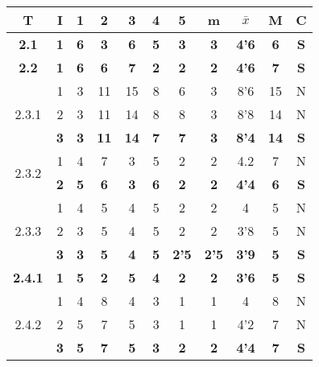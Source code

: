 \documentclass[11pt,a4paper,spanish,twoside]{report}
\begin{document}
\begin{table}[!h]
\centering
  \begin{tabular}{|c|c||c|c|c|c|c||c|c|c||c|}
    \hline
    \textbf{T} & \textbf{I} & \textbf{1} &
    \textbf{2} & \textbf{3} & \textbf{4} & \textbf{5} & \textbf{m}
    &\textbf{$\bar{x}$} &\textbf{M} & \textbf{C}\\
    \hline \hline
    \textbf{2.1} & \textbf{1} & \textbf{6} & \textbf{3} & \textbf{6} & \textbf{5} & \textbf{3} & \textbf{3} & \textbf{4'6} & \textbf{6} & \textbf{S}\\
    \hline

    \textbf{2.2} & \textbf{1} & \textbf{6} & \textbf{6} & \textbf{7} & \textbf{2} & \textbf{2} & \textbf{2} & \textbf{4'6} & \textbf{7} & \textbf{S}\\
    \hline

    \multirow{3}{*}{2.3.1}& 1 & 3 & 11 & 15 & 8 & 6 & 3 & 8'6 & 15 & N \\
    & 2 & 3 & 11 & 14 & 8 & 8 & 3 & 8'8 & 14 & N \\
    & \textbf{3} & \textbf{3} & \textbf{11} & \textbf{14} & \textbf{7} & \textbf{7} & \textbf{3} & \textbf{8'4} & \textbf{14} & \textbf{S} \\
    \hline

    \multirow{2}{*}{2.3.2} & 1 & 4 & 7 & 3 & 5 & 2 & 2 & 4.2 & 7 & N \\
    & \textbf{2} & \textbf{5} & \textbf{6} & \textbf{3} & \textbf{6} & \textbf{2} & \textbf{2} & \textbf{4'4} & \textbf{6} & \textbf{S} \\
    \hline

    \multirow{3}{*}{2.3.3}& 1 & 4 & 5 & 4 & 5 & 2 & 2 & 4 & 5 & N \\
    & 2 & 3 & 5 & 4 & 5 & 2 & 2 & 3'8 & 5 & N \\
    & \textbf{3} & \textbf{3} & \textbf{5} & \textbf{4} & \textbf{5} &
    \textbf{2'5} & \textbf{2'5} & \textbf{3'9} & \textbf{5} & \textbf{S} \\
    \hline

    \textbf{2.4.1} & \textbf{1} & \textbf{5} & \textbf{2} & \textbf{5} & \textbf{4} & \textbf{2} & \textbf{2} & \textbf{3'6} & \textbf{5} & \textbf{S} \\
    \hline

    \multirow{3}{*}{2.4.2}& 1 & 4 & 8 & 4 & 3 & 1 & 1 & 4 & 8 & N \\
    & 2 & 5 & 7 & 5 & 3 & 1 & 1 & 4'2 & 7 & N \\
    & \textbf{3} & \textbf{5} & \textbf{7} & \textbf{5} & \textbf{3} & \textbf{2} & \textbf{2} & \textbf{4'4} & \textbf{7} & \textbf{S} \\
    \hline


\end{tabular}
\end{table}
\end{document}
